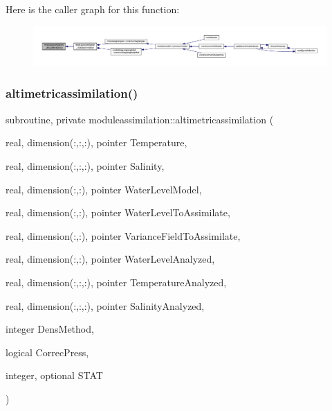 Here is the caller graph for this function\+:\nopagebreak
\begin{figure}[H]
\begin{center}
\leavevmode
\includegraphics[width=350pt]{namespacemoduleassimilation_aad981de22073d1a61a32131d203265ca_icgraph}
\end{center}
\end{figure}
\mbox{\label{namespacemoduleassimilation_af392c1f06d8b730776cfb5680aaf95cb}} 
\subsubsection{\texorpdfstring{altimetricassimilation()}{altimetricassimilation()}}
{\footnotesize\ttfamily subroutine, private moduleassimilation\+::altimetricassimilation (\begin{DoxyParamCaption}\item[{real, dimension(\+:,\+:,\+:), pointer}]{Temperature,  }\item[{real, dimension(\+:,\+:,\+:), pointer}]{Salinity,  }\item[{real, dimension(\+:,\+:), pointer}]{Water\+Level\+Model,  }\item[{real, dimension(\+:,\+:), pointer}]{Water\+Level\+To\+Assimilate,  }\item[{real, dimension(\+:,\+:), pointer}]{Variance\+Field\+To\+Assimilate,  }\item[{real, dimension(\+:,\+:), pointer}]{Water\+Level\+Analyzed,  }\item[{real, dimension(\+:,\+:,\+:), pointer}]{Temperature\+Analyzed,  }\item[{real, dimension(\+:,\+:,\+:), pointer}]{Salinity\+Analyzed,  }\item[{integer}]{Dens\+Method,  }\item[{logical}]{Correc\+Press,  }\item[{integer, optional}]{S\+T\+AT }\end{DoxyParamCaption})\hspace{0.3cm}{\ttfamily [private]}}

